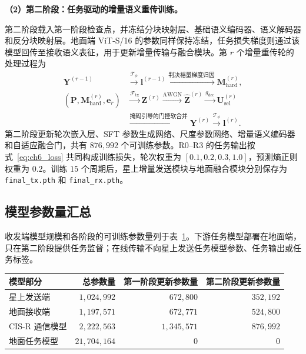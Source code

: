 \noindent\textbf{（2）第二阶段：任务驱动的增量语义重传训练。}

第二阶段载入第一阶段检查点，并冻结分块映射层、基础语义编码器、语义解码器和反分块映射层。地面端 ViT-S/16 的参数同样保持冻结，任务损失梯度则通过该模型回传至接收语义表征，用于更新增量传输与融合模块。第 $r$ 个增量重传轮的处理过程为
\begin{equation}
\begin{aligned}
\mathbf Y^{(r-1)}
&\xrightarrow{\mathcal T_\phi}
\mathbf l^{(r-1)}
\xrightarrow{\text{判决裕量梯度归因}}
\mathbf M_{\mathrm{hard}}^{(r)},\\
\left(\mathbf P,\mathbf M_{\mathrm{hard}}^{(r)},\mathbf e_r\right)
&\xrightarrow{\mathcal F_{\mathrm{tx}}}
\mathbf Z^{(r)}
\xrightarrow{\mathrm{AWGN}}
\hat{\mathbf Z}^{(r)}
\xrightarrow{g_{\mathrm{dec}}}
\mathbf U_{\mathrm{sel}}^{(r)}\\
&\xrightarrow{\text{掩码引导的门控软合并}}
\mathbf Y^{(r)}
\xrightarrow{\mathcal T_\phi}
\mathbf l^{(r)}.
\end{aligned}
\label{eq:app_ch6_stage2_flow}
\end{equation}
第二阶段更新轮次嵌入层、SFT 参数生成网络、尺度参数网络、增量语义编码器和自适应融合门，共有 $876{,}992$ 个可训练参数。R0--R3 的任务输出按式~\eqref{eq:ch6_loss} 共同构成训练损失，轮次权重为 $[0.1,0.2,0.3,1.0]$，预测熵正则权重为 $0.2$。训练 $15$ 个周期后，星上增量发送模块与地面融合模块分别保存为 \texttt{final\_tx.pth} 和 \texttt{final\_rx.pth}。

\subsection{模型参数量汇总}

收发端模型规模和各阶段的可训练参数量列于表~\ref{tab:app_ch6_parameter_summary}。下游任务模型部署在地面端，只在第二阶段提供任务监督；在线传输不向星上发送任务模型参数、任务输出或任务标签。

\begin{table}[!htp]
    \centering
    \label{tab:app_ch6_parameter_summary}
    \small
    \renewcommand{\arraystretch}{1.15}
    \begin{tabular}{@{}lrrr@{}}
        \toprule
        模型部分 & 总参数量 & 第一阶段更新参数量 & 第二阶段更新参数量 \\
        \midrule
        星上发送端 & $1{,}024{,}992$ & $672{,}800$ & $352{,}192$ \\
        地面接收端 & $1{,}197{,}571$ & $672{,}771$ & $524{,}800$ \\
        CIS-R 通信模型 & $2{,}222{,}563$ & $1{,}345{,}571$ & $876{,}992$ \\
        地面任务模型 & $21{,}704{,}164$ & $0$ & $0$ \\
        \bottomrule
    \end{tabular}
\end{table}
